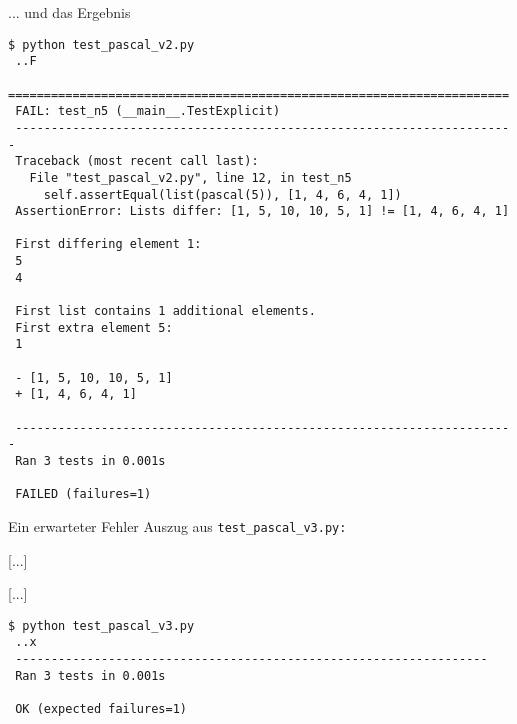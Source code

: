 \documentclass[t, utf8x, 10pt]{beamer}
\begin{document}
\begin{frame}[fragile]{... und das Ergebnis}
 \begin{scriptsize}
  \begin{lstlisting}[language={}]
 $ python test_pascal_v2.py
 ..F
 ======================================================================
 FAIL: test_n5 (__main__.TestExplicit)
 ----------------------------------------------------------------------
 Traceback (most recent call last):
   File "test_pascal_v2.py", line 12, in test_n5
     self.assertEqual(list(pascal(5)), [1, 4, 6, 4, 1])
 AssertionError: Lists differ: [1, 5, 10, 10, 5, 1] != [1, 4, 6, 4, 1]

 First differing element 1:
 5
 4

 First list contains 1 additional elements.
 First extra element 5:
 1

 - [1, 5, 10, 10, 5, 1]
 + [1, 4, 6, 4, 1]

 ----------------------------------------------------------------------
 Ran 3 tests in 0.001s

 FAILED (failures=1)
  \end{lstlisting}
 \end{scriptsize}
\end{frame}


\begin{frame}[fragile]{Ein erwarteter Fehler}
 Auszug aus \texttt{test\_pascal\_v3.py:}
 \begin{small}
 
 [...]
 
 [...]
 

 \hrulefill

  \begin{lstlisting}[language={}]
 $ python test_pascal_v3.py
 ..x
 ------------------------------------------------------------------
 Ran 3 tests in 0.001s

 OK (expected failures=1)
  \end{lstlisting}
 \end{small}
\end{frame}
\end{document}
